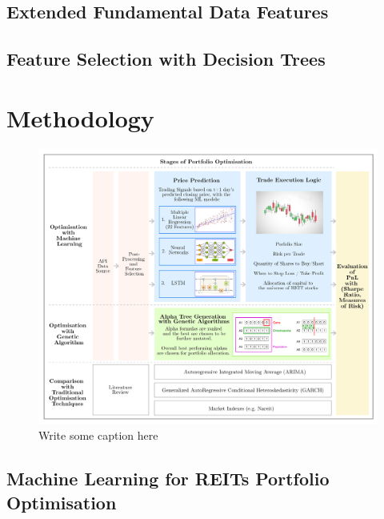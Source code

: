 \documentclass[a4paper,12pt]{report}
\numberwithin{equation}{section}
\theoremstyle{definition}
\begin{document}
\section{Extended Fundamental Data Features}
\section{Feature Selection with Decision Trees}

\def\fillandplacepagenumber{%
 \par\pagestyle{empty}%
 \vbox to 0pt{\vss}\vfill
 \vbox to 0pt{\baselineskip0pt
   \hbox to\linewidth{\hss}%
   \baselineskip\footskip
   \hbox to\linewidth{%
     \hfil\thepage\hfil}\vss}}



\chapter{Methodology}

\begin{figure}[H]
\centerline{\includegraphics[width=21cm]{Overall_Methodology}}
\caption{Write some caption here}\label{visina8}
\end{figure}





\section{Machine Learning for REITs Portfolio Optimisation}
\end{document}
